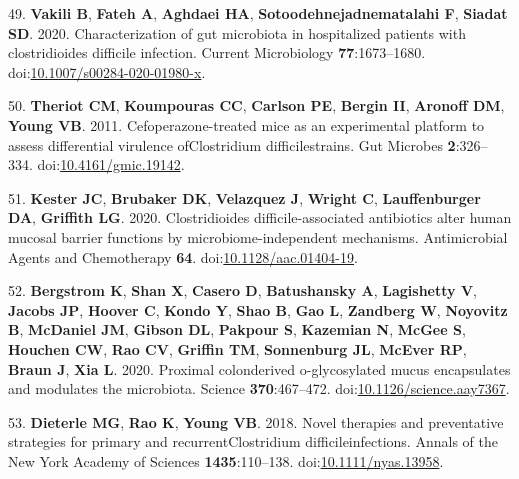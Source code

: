 \documentclass[
  11pt,
]{article}
\begin{document}
\leavevmode\hypertarget{ref-Vakili2020b}{}%
49. \textbf{Vakili B}, \textbf{Fateh A}, \textbf{Aghdaei HA},
\textbf{Sotoodehnejadnematalahi F}, \textbf{Siadat SD}. 2020.
Characterization of gut microbiota in hospitalized patients with
clostridioides difficile infection. Current Microbiology
\textbf{77}:1673--1680.
doi:\href{https://doi.org/10.1007/s00284-020-01980-x}{10.1007/s00284-020-01980-x}.

\leavevmode\hypertarget{ref-Theriot2011}{}%
50. \textbf{Theriot CM}, \textbf{Koumpouras CC}, \textbf{Carlson PE},
\textbf{Bergin II}, \textbf{Aronoff DM}, \textbf{Young VB}. 2011.
Cefoperazone-treated mice as an experimental platform to assess
differential virulence ofClostridium difficilestrains. Gut Microbes
\textbf{2}:326--334.
doi:\href{https://doi.org/10.4161/gmic.19142}{10.4161/gmic.19142}.

\leavevmode\hypertarget{ref-Kester2020}{}%
51. \textbf{Kester JC}, \textbf{Brubaker DK}, \textbf{Velazquez J},
\textbf{Wright C}, \textbf{Lauffenburger DA}, \textbf{Griffith LG}.
2020. Clostridioides difficile-associated antibiotics alter human
mucosal barrier functions by microbiome-independent mechanisms.
Antimicrobial Agents and Chemotherapy \textbf{64}.
doi:\href{https://doi.org/10.1128/aac.01404-19}{10.1128/aac.01404-19}.

\leavevmode\hypertarget{ref-Bergstrom2020}{}%
52. \textbf{Bergstrom K}, \textbf{Shan X}, \textbf{Casero D},
\textbf{Batushansky A}, \textbf{Lagishetty V}, \textbf{Jacobs JP},
\textbf{Hoover C}, \textbf{Kondo Y}, \textbf{Shao B}, \textbf{Gao L},
\textbf{Zandberg W}, \textbf{Noyovitz B}, \textbf{McDaniel JM},
\textbf{Gibson DL}, \textbf{Pakpour S}, \textbf{Kazemian N},
\textbf{McGee S}, \textbf{Houchen CW}, \textbf{Rao CV}, \textbf{Griffin
TM}, \textbf{Sonnenburg JL}, \textbf{McEver RP}, \textbf{Braun J},
\textbf{Xia L}. 2020. Proximal colonderived o-glycosylated mucus
encapsulates and modulates the microbiota. Science
\textbf{370}:467--472.
doi:\href{https://doi.org/10.1126/science.aay7367}{10.1126/science.aay7367}.

\leavevmode\hypertarget{ref-Dieterle2018}{}%
53. \textbf{Dieterle MG}, \textbf{Rao K}, \textbf{Young VB}. 2018. Novel
therapies and preventative strategies for primary and
recurrentClostridium difficileinfections. Annals of the New York Academy
of Sciences \textbf{1435}:110--138.
doi:\href{https://doi.org/10.1111/nyas.13958}{10.1111/nyas.13958}.
\end{document}
